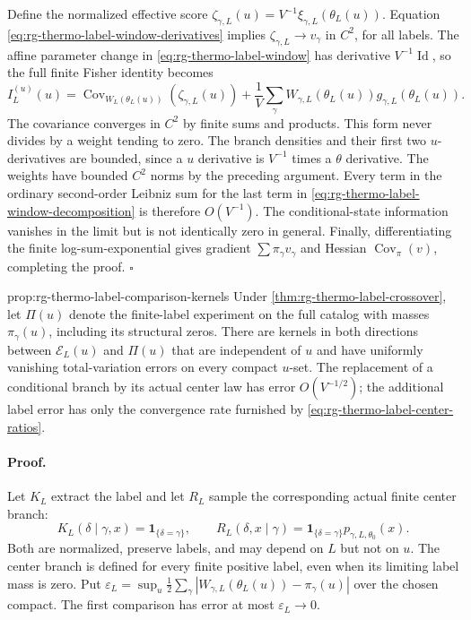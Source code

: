 Define the normalized effective score
$\zeta_{\gamma,L}(u)=V^{-1}\xi_{\gamma,L}(\theta_L(u))$.
Equation \cref{eq:rg-thermo-label-window-derivatives} implies
$\zeta_{\gamma,L}\to v_\gamma$ in $C^2$, for all labels.
The affine parameter change in \cref{eq:rg-thermo-label-window}
has derivative $V^{-1}\operatorname{Id}$, so the full finite Fisher
identity becomes
\begin{equation}
 I_L^{(u)}(u)=\operatorname{Cov}_{W_L(\theta_L(u))}
                         (\zeta_{\gamma,L}(u))
       +\frac1V\sum_\gamma W_{\gamma,L}(\theta_L(u))
                                g_{\gamma,L}(\theta_L(u)).
 \label{eq:rg-thermo-label-window-decomposition}
\end{equation}
The covariance converges in $C^2$ by finite sums and products. This
form never divides by a weight tending to zero. The branch densities
and their first two $u$-derivatives are bounded, since a $u$ derivative
is $V^{-1}$ times a $\theta$ derivative. The weights have bounded $C^2$
norms by the preceding argument. Every term in the ordinary
second-order Leibniz sum for the last term in
\cref{eq:rg-thermo-label-window-decomposition} is therefore $O(V^{-1})$.
The conditional-state information vanishes in the limit but is not
identically zero in general. Finally, differentiating the finite
log-sum-exponential gives gradient $\sum\pi_\gamma v_\gamma$ and
Hessian $\operatorname{Cov}_\pi(v)$, completing the proof. $\square$

{prop:rg-thermo-label-comparison-kernels}
Under \cref{thm:rg-thermo-label-crossover}, let $\Pi(u)$ denote the
finite-label experiment on the full catalog with masses
$\pi_\gamma(u)$, including its structural zeros. There are kernels in
both directions between $\mathcal E_L(u)$ and $\Pi(u)$ that are
independent of $u$ and have uniformly vanishing total-variation errors
on every compact $u$-set. The replacement of a conditional branch by
its actual center law has error $O(V^{-1/2})$; the additional label
error has only the convergence rate furnished by
\cref{eq:rg-thermo-label-center-ratios}.\thermoestablishedstatus


\paragraph{Proof.}
Let $K_L$ extract the label and let $R_L$ sample the corresponding
actual finite center branch:
\begin{equation}
 K_L(\delta\mid\gamma,x)=\boldsymbol1_{\{\delta=\gamma\}},\qquad
 R_L(\delta,x\mid\gamma)=\boldsymbol1_{\{\delta=\gamma\}}
                                      p_{\gamma,L,\theta_0}(x).
 \label{eq:rg-thermo-label-comparison-kernels}
\end{equation}
Both are normalized, preserve labels, and may depend on $L$ but not on
$u$. The center branch is defined for every finite positive label,
even when its limiting label mass is zero. Put
$\varepsilon_L=\sup_u\frac12\sum_\gamma
 |W_{\gamma,L}(\theta_L(u))-\pi_\gamma(u)|$ over the chosen compact.
The first comparison has error at most $\varepsilon_L\to0$.

